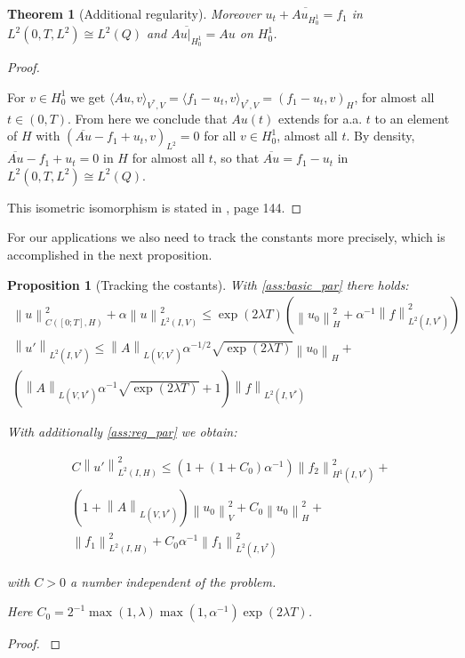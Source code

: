 \documentclass[english,a4paper,9pt,oneside]{scrbook}	%
\theoremstyle{break}
\newtheorem{thm}[equation]{Theorem}
\newtheorem{prop}[equation]{Proposition}
\newenvironment{mproof}[1][\proofname]{%
  \begin{proof}[#1]$ $\par\nobreak\ignorespaces
}{%
  \end{proof}
}
\renewcommand*{\proofname}{Proof}
\theoremstyle{remark}
\newcommand{\ds}{\displaystyle}
\newcommand{\norm}[1]{\left\lVert#1\right\rVert}
\newcommand{\HN}[1]{\norm{#1}_{H}}
\newcommand{\VN}[1]{\norm{#1}_{V}}
\begin{document}
\begin{appendices}
\begin{thm}[Additional regularity]
Moreover $u_t+\overline{Au_{H^1_0}}=f_1$ in $L^2(0,T,L^2)\cong L^2(Q)$ and $\overline{Au|_{H^1_0}}=Au$ on $H^1_0$.

\end{thm}
\begin{mproof}

For $v \in H^1_0$ we get $ \langle Au,v \rangle_{V^*,V} =  \langle f_1-u_t,v \rangle_{V^*,V} = ( f_1-u_t,v )_H$, for almost all $t \in (0,T)$. From here we conclude that $Au(t)$ extends for a.a. $t$ to an element of $H$ with $(\overline{Au}-f_1+u_t,v)_{L^2}=0$ for all $v \in H^1_0$, almost all $t$. By density, $\overline{Au}-f_1+u_t=0$ in $H$ for almost all $t$, so that $\overline{Au}=f_1-u_t$ in $L^2(0,T,L^2)\cong L^2(Q)$.

This isometric isomorphism is stated in \cite{trol}, page 144. 

\end{mproof}

For our applications we also need to track the constants more precisely, which is accomplished in the next proposition.

\begin{prop}[Tracking the costants]
\label{thm:const_track}
With \cref{ass:basic_par} there holds:
\begin{align}
\norm{u}^2_{C([0;T],H)}+\alpha\norm{u}_{L^2(I,V)}^2\leq \exp(2\lambda T)(\HN{u_0}^2+\alpha^{-1}\norm{f}^2_{L^2(I,V^*)})\\
\norm{u'}_{L^2(I,V^*)}\leq \norm{A}_{L(V,V^*)}\alpha^{-1/2}\sqrt{\exp(2\lambda T)}\HN{u_0} +\\\left (\norm{A}_{L(V,V^*)}\alpha^{-1}\sqrt{\exp(2\lambda T)}+1\right ) \norm{f}_{L^2(I,V^*)}
\end{align}

With additionally \cref{ass:reg_par} we obtain:

\begin{align}
C\norm{u'}^2_{L^2(I,H)}\leq 
(1+(1+C_0)\alpha^{-1})\norm{f_2}_{H^1(I,V^*)}^2+\\
(1+\norm{A}_{L(V,V^*)})\VN{u_{0}}^2+C_0\HN{u_0}^2+\\
\norm{f_1}_{L^2(I,H)}^2+C_0\alpha^{-1}\norm{f_1}^2_{L^2(I,V^*)}
\end{align}

with $C>0$ a number independent of the problem.

Here $C_0 = \ds 2^{-1}\max(1,\lambda)\max(1,\alpha^{-1})\exp(2\lambda T)$.

\end{prop}
\begin{mproof}


\end{mproof}
\end{appendices}
\end{document}
